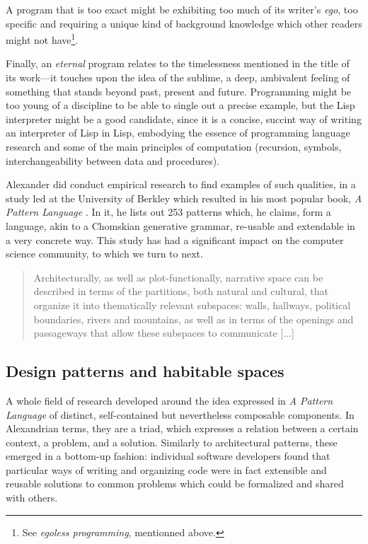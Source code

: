 A program that is too exact might be exhibiting too much of its writer's \emph{ego}, too specific and requiring a unique kind of background knowledge which other readers might not have\footnote{See \emph{egoless programming}, mentionned above.}.

Finally, an \emph{eternal} program relates to the timelessness mentioned in the title of its work—it touches upon the idea of the sublime, a deep, ambivalent feeling of something that stands beyond past, present and future. Programming might be too young of a discipline to be able to single out a precise example, but the Lisp interpreter might be a good candidate, since it is a concise, succint way of writing an interpreter of Lisp in Lisp, embodying the essence of programming language research and some of the main principles of computation (recursion, symbols, interchangeability between data and procedures).

Alexander did conduct empirical research to find examples of such qualities, in a study led at the University of Berkley which resulted in his most popular book, \emph{A Pattern Language} \citep{alexander_pattern_1977}. In it, he lists out 253 patterns which, he claims, form a language, akin to a Chomskian generative grammar, re-usable and extendable in a very concrete way. This study has had a significant impact on the computer science community, to which we turn to next.

\begin{quote}
    Architecturally, as well as plot-functionally, narrative space can be described in terms of the partitions, both natural and cultural, that organize it into thematically relevant subspaces: walls, hallways, political boundaries, rivers and mountains, as well as in terms of the openings and passageways that allow these subspaces to communicate [...]  \citep{ryan_space_2009}
\end{quote}

\subsection{Design patterns and habitable spaces}
\label{subsubsec:design-patterns}



A whole field of research developed around the idea expressed in \emph{A Pattern Language}  of distinct, self-contained but nevertheless composable components. In Alexandrian terms, they are a triad, which expresses a relation between a certain context, a problem, and a solution. Similarly to architectural patterns, these emerged in a bottom-up fashion: individual software developers found that particular ways of writing and organizing code were in fact extensible and reusable solutions to common problems which could be formalized and shared with others.

